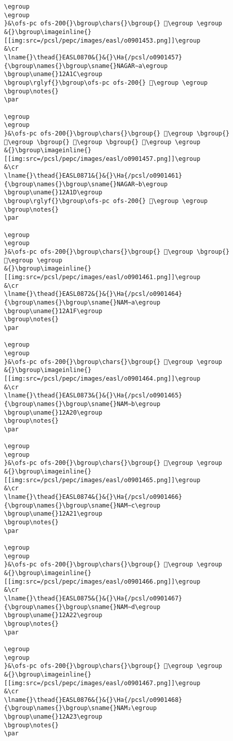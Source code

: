 \begin{verbatim}
\egroup
\egroup
}&\ofs-pc ofs-200{}\bgroup\chars{}\bgroup{} 𒨘\egroup \egroup
&{}\bgroup\imageinline{}[[img:src=/pcsl/pepc/images/easl/o0901453.png]]\egroup
&\cr
\lname{}\thead{}EASL0870&{}&{}\Ha{/pcsl/o0901457}{\bgroup\names{}\bgroup\sname{}NAGAR∼a\egroup
\bgroup\uname{}12A1C\egroup
\bgroup\rglyf{}\bgroup\ofs-pc ofs-200{} 𒨜\egroup \egroup
\bgroup\notes{}
\par 

\egroup
\egroup
}&\ofs-pc ofs-200{}\bgroup\chars{}\bgroup{} 𒨙\egroup \bgroup{} 𒨚\egroup \bgroup{} 𒨛\egroup \bgroup{} 𒨜\egroup \egroup
&{}\bgroup\imageinline{}[[img:src=/pcsl/pepc/images/easl/o0901457.png]]\egroup
&\cr
\lname{}\thead{}EASL0871&{}&{}\Ha{/pcsl/o0901461}{\bgroup\names{}\bgroup\sname{}NAGAR∼b\egroup
\bgroup\uname{}12A1D\egroup
\bgroup\rglyf{}\bgroup\ofs-pc ofs-200{} 𒨝\egroup \egroup
\bgroup\notes{}
\par 

\egroup
\egroup
}&\ofs-pc ofs-200{}\bgroup\chars{}\bgroup{} 𒨝\egroup \bgroup{} 𒨞\egroup \egroup
&{}\bgroup\imageinline{}[[img:src=/pcsl/pepc/images/easl/o0901461.png]]\egroup
&\cr
\lname{}\thead{}EASL0872&{}&{}\Ha{/pcsl/o0901464}{\bgroup\names{}\bgroup\sname{}NAM∼a\egroup
\bgroup\uname{}12A1F\egroup
\bgroup\notes{}
\par 

\egroup
\egroup
}&\ofs-pc ofs-200{}\bgroup\chars{}\bgroup{} 𒨟\egroup \egroup
&{}\bgroup\imageinline{}[[img:src=/pcsl/pepc/images/easl/o0901464.png]]\egroup
&\cr
\lname{}\thead{}EASL0873&{}&{}\Ha{/pcsl/o0901465}{\bgroup\names{}\bgroup\sname{}NAM∼b\egroup
\bgroup\uname{}12A20\egroup
\bgroup\notes{}
\par 

\egroup
\egroup
}&\ofs-pc ofs-200{}\bgroup\chars{}\bgroup{} 𒨠\egroup \egroup
&{}\bgroup\imageinline{}[[img:src=/pcsl/pepc/images/easl/o0901465.png]]\egroup
&\cr
\lname{}\thead{}EASL0874&{}&{}\Ha{/pcsl/o0901466}{\bgroup\names{}\bgroup\sname{}NAM∼c\egroup
\bgroup\uname{}12A21\egroup
\bgroup\notes{}
\par 

\egroup
\egroup
}&\ofs-pc ofs-200{}\bgroup\chars{}\bgroup{} 𒨡\egroup \egroup
&{}\bgroup\imageinline{}[[img:src=/pcsl/pepc/images/easl/o0901466.png]]\egroup
&\cr
\lname{}\thead{}EASL0875&{}&{}\Ha{/pcsl/o0901467}{\bgroup\names{}\bgroup\sname{}NAM∼d\egroup
\bgroup\uname{}12A22\egroup
\bgroup\notes{}
\par 

\egroup
\egroup
}&\ofs-pc ofs-200{}\bgroup\chars{}\bgroup{} 𒨢\egroup \egroup
&{}\bgroup\imageinline{}[[img:src=/pcsl/pepc/images/easl/o0901467.png]]\egroup
&\cr
\lname{}\thead{}EASL0876&{}&{}\Ha{/pcsl/o0901468}{\bgroup\names{}\bgroup\sname{}NAM₂\egroup
\bgroup\uname{}12A23\egroup
\bgroup\notes{}
\par 


\end{verbatim}
